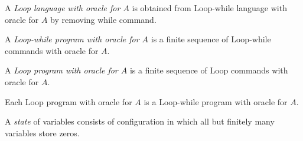 \documentclass[10pt]{amsart}
\begin{document}
\begin{definition}
	A \textit{Loop language with oracle for $A$} is obtained from Loop-while language with oracle for $A$ by removing while command.
\end{definition}

\begin{definition}
	A \textit{Loop-while program with oracle for $A$} is a finite sequence of Loop-while commands with oracle for $A$.
\end{definition}

\begin{definition}
	A \textit{Loop program with oracle for $A$} is a finite sequence of Loop commands with oracle for $A$.
\end{definition}

\begin{remark}\label{remark:each_Loop_program_is_Loop_while_program}
	Each Loop program with oracle for $A$ is a Loop-while program with oracle for $A$.
\end{remark}

\begin{definition}
	A \textit{state} of variables consists of configuration in which all but finitely many variables store zeros.
\end{definition}
\end{document}
